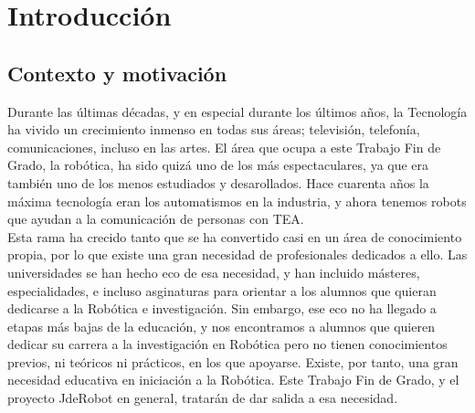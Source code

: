 \chapter{Introducción}
\label{cap:introduccion}

\section{Contexto y motivación}
Durante las últimas décadas, y en especial durante los últimos años, la Tecnología ha vivido un crecimiento inmenso en todas sus áreas; televisión, telefonía, comunicaciones, incluso en las artes. El área que ocupa a este Trabajo Fin de Grado, la robótica, ha sido quizá uno de los más espectaculares, ya que era también uno de los menos estudiados y desarollados. Hace cuarenta años la máxima tecnología eran los automatismos en la industria, y ahora tenemos robots que ayudan a la comunicación de personas con TEA.\\
Esta rama ha crecido tanto que se ha convertido casi en un área de conocimiento propia, por lo que existe una gran necesidad de profesionales dedicados a ello. Las universidades se han hecho eco de esa necesidad, y han incluido másteres, especialidades, e incluso asginaturas para orientar a los alumnos que quieran dedicarse a la Robótica e investigación. Sin embargo, ese eco no ha llegado a etapas más bajas de la educación, y nos encontramos a alumnos que quieren dedicar su carrera a la investigación en Robótica pero no tienen conocimientos previos, ni teóricos ni prácticos, en los que apoyarse. Existe, por tanto, una gran necesidad educativa en iniciación a la Robótica. Este Trabajo Fin de Grado, y el proyecto JdeRobot en general, tratarán de dar salida a esa necesidad. 